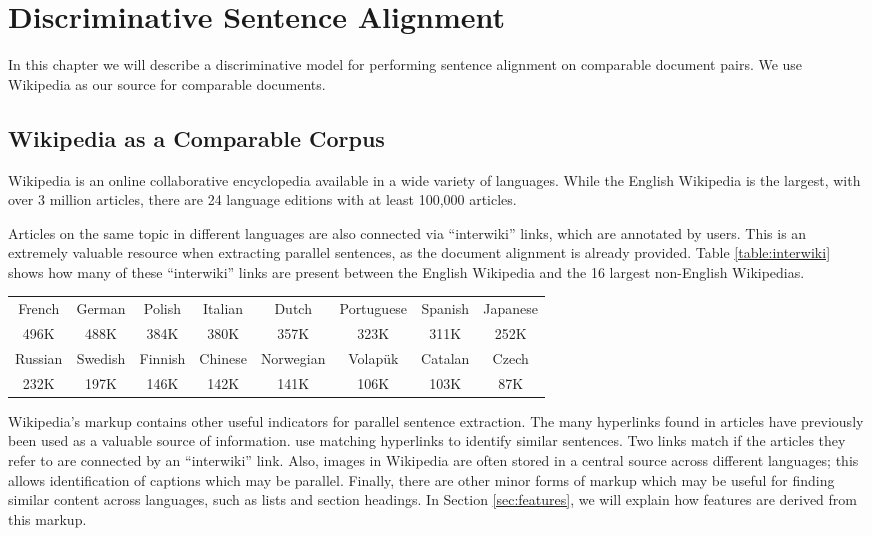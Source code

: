 \chapter{Discriminative Sentence Alignment}
\label{chap:supervised}

In this chapter we will describe a discriminative model for performing sentence
alignment on comparable document pairs. We use Wikipedia as our source for
comparable documents.

\section{Wikipedia as a Comparable Corpus}
\label{sec:wiki}
Wikipedia \citep{wikipedia} is an online collaborative encyclopedia available in
a wide variety of languages.  While the English Wikipedia is the largest, with
over 3 million articles, there are 24 language editions with at least 100,000
articles.

Articles on the same topic in different languages are also connected via
``interwiki'' links, which are annotated by users.  This is an extremely
valuable resource when extracting parallel sentences, as the document alignment
is already provided.  
Table \ref{table:interwiki} shows how
many of these ``interwiki'' links are present between the English Wikipedia and the
16 largest non-English Wikipedias.

\begin{table*}
\small
\begin{center}
\begin{tabular}{|c|c|c|c|c|c|c|c|}
\hline
French & German & Polish & Italian & Dutch & Portuguese & Spanish & Japanese \\
496K & 488K & 384K & 380K & 357K & 323K & 311K & 252K\\
\hline
Russian & Swedish & Finnish & Chinese & Norwegian & Volap\"{u}k & Catalan & Czech \\
232K & 197K & 146K & 142K & 141K & 106K & 103K & 87K\\
\hline
\end{tabular}
\end{center}
\caption{Number of aligned bilingual articles in Wikipedia by language (paired with English).}
\label{table:interwiki}
\end{table*}

Wikipedia's markup contains other useful indicators for parallel sentence
extraction.  The many hyperlinks found in articles have previously been used as
a valuable source of information.  \citep{Adafre06} use matching
hyperlinks to identify similar sentences.  Two links match if the articles they
refer to are connected by an ``interwiki'' link.
Also, images in Wikipedia are often stored in a central source across
different languages; this allows identification of captions which may be
parallel.  Finally, there are other minor forms
of markup which may be useful for finding similar content across languages, such
as lists and section headings.  In Section \ref{sec:features}, we will explain
how features are derived from this markup.

